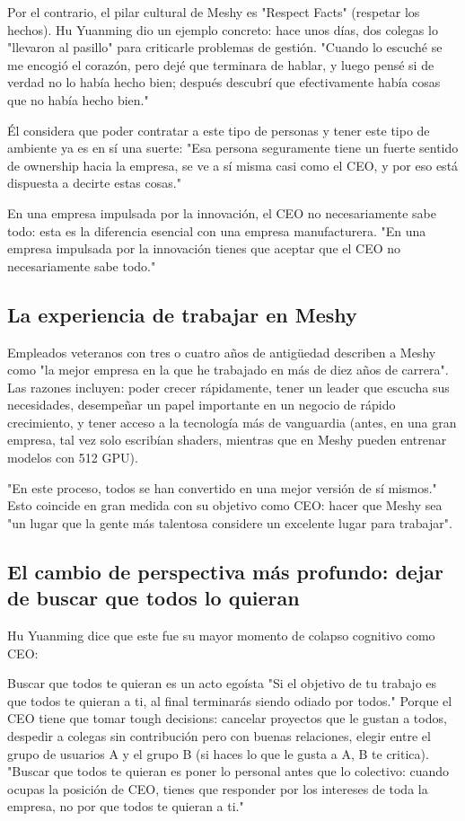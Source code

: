 \documentclass[a4paper]{article}
\begin{document}
Por el contrario, el pilar cultural de Meshy es "Respect Facts" (respetar los hechos). Hu Yuanming dio un ejemplo concreto: hace unos días, dos colegas lo "llevaron al pasillo" para criticarle problemas de gestión. "Cuando lo escuché se me encogió el corazón, pero dejé que terminara de hablar, y luego pensé si de verdad no lo había hecho bien; después descubrí que efectivamente había cosas que no había hecho bien."

Él considera que poder contratar a este tipo de personas y tener este tipo de ambiente ya es en sí una suerte: "Esa persona seguramente tiene un fuerte sentido de ownership hacia la empresa, se ve a sí misma casi como el CEO, y por eso está dispuesta a decirte estas cosas."

En una empresa impulsada por la innovación, el CEO no necesariamente sabe todo: esta es la diferencia esencial con una empresa manufacturera. "En una empresa impulsada por la innovación tienes que aceptar que el CEO no necesariamente sabe todo."

\subsection{La experiencia de trabajar en Meshy}

Empleados veteranos con tres o cuatro años de antigüedad describen a Meshy como "la mejor empresa en la que he trabajado en más de diez años de carrera". Las razones incluyen: poder crecer rápidamente, tener un leader que escucha sus necesidades, desempeñar un papel importante en un negocio de rápido crecimiento, y tener acceso a la tecnología más de vanguardia (antes, en una gran empresa, tal vez solo escribían shaders, mientras que en Meshy pueden entrenar modelos con 512 GPU).

"En este proceso, todos se han convertido en una mejor versión de sí mismos." Esto coincide en gran medida con su objetivo como CEO: hacer que Meshy sea "un lugar que la gente más talentosa considere un excelente lugar para trabajar".

\subsection{El cambio de perspectiva más profundo: dejar de buscar que todos lo quieran}

Hu Yuanming dice que este fue su mayor momento de colapso cognitivo como CEO:

\begin{warningbox}{Buscar que todos te quieran es un acto egoísta}
"Si el objetivo de tu trabajo es que todos te quieran a ti, al final terminarás siendo odiado por todos." Porque el CEO tiene que tomar tough decisions: cancelar proyectos que le gustan a todos, despedir a colegas sin contribución pero con buenas relaciones, elegir entre el grupo de usuarios A y el grupo B (si haces lo que le gusta a A, B te critica). "Buscar que todos te quieran es poner lo personal antes que lo colectivo: cuando ocupas la posición de CEO, tienes que responder por los intereses de toda la empresa, no por que todos te quieran a ti."
\end{warningbox}
\end{document}
